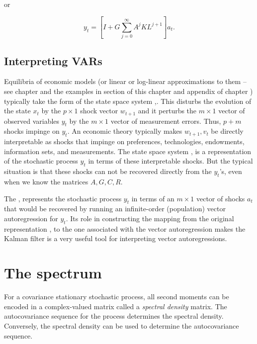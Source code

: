 or

$$ y_t = [ I + G \sum_{j=0}^\infty A^j K L^{j+1}  ] a_t .$$

\subsection{Interpreting VARs}

Equilibria of economic models (or linear or log-linear approximations to them -- see chapter  and the examples
in section  of this chapter and appendix  of chapter )  typically
take the form of the state space system ,.  This    disturbs the evolution of the  state $x_t$
by the $p\times 1 $ shock vector $w_{t+1}$  and it perturbs the $ m \times 1$ vector of observed variables $y_t$
by the $ m \times 1$ vector of measurement errors. Thus,  $p + m$ shocks  impinge on $y_t$.
An economic theory typically makes  $w_{t+1}, v_t$ be directly interpretable as shocks that impinge on preferences, technologies,
endowments, information sets, and measurements.
The state space system  , is a representation of the stochastic process  $y_t$ in terms of these interpretable shocks.
But the typical situation is that these shocks can  not be recovered directly from the $y_t$'s, even when we know the matrices $A, G, C, R$.

The  ,  represents  the %
stochastic process $y_t$
in terms of an $ m \times 1$ vector of shocks $a_t$ that would  be recovered by running an infinite-order (population) vector autoregression
for $y_t$.  Its role in constructing the mapping from the original representation , to the one associated
with the vector autoregression  makes the    Kalman filter is a very useful tool for interpreting vector autoregressions.
%




\section{The spectrum}\label{sec:spectrum}%
 For a covariance stationary stochastic process,  all second moments
can be encoded in a complex-valued matrix called a
{\it spectral density} matrix.  The autocovariance sequence for
the process  determines the spectral density. Conversely,
the spectral density can be used to determine the autocovariance sequence.

